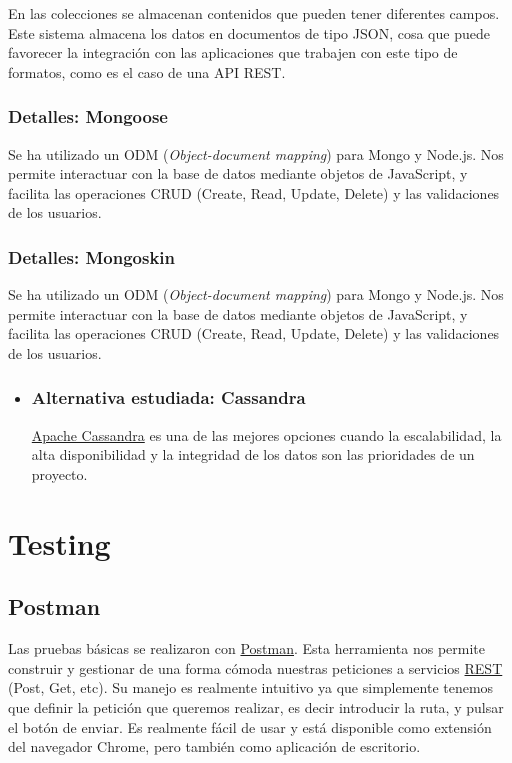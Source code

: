 En las colecciones se almacenan contenidos que pueden tener diferentes campos. Este sistema almacena los datos en documentos de tipo JSON, cosa que puede favorecer la integración con las aplicaciones que trabajen con este tipo de formatos, como es el caso de una API REST. 


\subsubsection{Detalles: Mongoose}\label{mongoose}
Se ha utilizado un ODM (\emph{Object-document mapping}) para Mongo y Node.js. Nos permite interactuar con la base de datos mediante objetos de JavaScript, y facilita las operaciones CRUD (Create, Read, Update, Delete) y las validaciones de los usuarios.

\subsubsection{Detalles: Mongoskin}\label{mongoskin}
Se ha utilizado un ODM (\emph{Object-document mapping}) para Mongo y Node.js. Nos permite interactuar con la base de datos mediante objetos de JavaScript, y facilita las operaciones CRUD (Create, Read, Update, Delete) y las validaciones de los usuarios.

\begin{itemize}
	\item	\subsubsection{Alternativa estudiada: Cassandra}\label{cassandra}
	\href{https://www.cassandra.apache.org/}{Apache Cassandra} es una de las mejores opciones cuando la escalabilidad, la alta disponibilidad y la integridad de los datos son las prioridades de un proyecto.
\end{itemize}


\section{Testing}\label{testing}


\subsection{Postman}\label{postman}
Las pruebas básicas se realizaron con  \href{https://www.getpostman.com}{Postman}. Esta herramienta nos permite construir y gestionar de una forma cómoda nuestras peticiones a servicios \href{https://es.wikipedia.org/wiki/Transferencia_de_Estado_Representacional}{REST} (Post, Get, etc). Su manejo es realmente intuitivo ya que simplemente tenemos que definir la petición que queremos realizar, es decir introducir la ruta, y pulsar el botón de enviar. Es realmente fácil de usar y está disponible como extensión del navegador Chrome, pero también como aplicación de escritorio.


